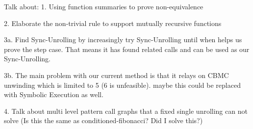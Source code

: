 Talk about:
1. Using function summaries to prove non-equivalence

2. Elaborate the non-trivial rule to support mutually recursive functions

3a. Find Sync-Unrolling by increasingly try Sync-Unrolling until when helps us prove the step case. That means it has found related calls and can be used as our Sync-Unrolling. 

3b. The main problem with our current method is that it relays on CBMC unwinding which is limited to 5 (6 is unfeasible). 
maybe this could be replaced with Symbolic Execution as well.


4. Talk about multi level pattern call graphs that a fixed single unrolling can not solve (Is this the same as conditioned-fibonacci? Did I solve this?)  
